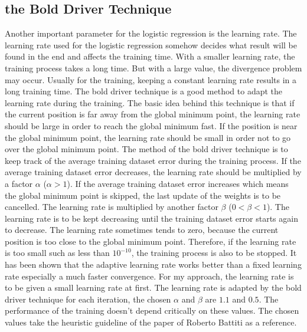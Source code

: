 \subsection{the Bold Driver Technique}
Another important parameter for the logistic regression is the learning rate. The learning rate used  for the logistic regression somehow decides what result will be found in the end and affects the training time. With a smaller learning rate, the training process takes a long time. But with a large value, the divergence problem may occur. Usually for the training, keeping a constant learning rate results in a long training time. The bold driver technique is a good method to adapt the learning rate during the training. The basic idea behind this technique is that if the current position is far away from the global minimum point, the learning rate should be large in order to reach the global minimum fast. If the position is near the global minimum point, the learning rate should be small in order not to go over the global minimum point. The method of the bold driver technique is to keep track of the average training dataset error during the training process. If the average training dataset error decreases, the learning rate should be multiplied by a factor $\alpha$ ($\alpha>1$). If the average training dataset error increases which means the global minimum point is skipped, the last update of the weights is to be cancelled. The learning rate is multiplied by another factor $\beta$ ($0<\beta<1$). The learning rate is to be kept decreasing until the training dataset error starts again to decrease. The learning rate sometimes tends to zero, because the current position is too close to the global minimum point. Therefore, if the learning rate is too small such as less than $10^{-10}$, the training process is also to be stopped. It has been shown that the adaptive learning rate works better than a fixed learning rate especially a much faster convergence. For my approach, the learning rate is to be given a small learning rate at first. The learning rate is adapted by the bold driver technique for each iteration, the chosen $\alpha$ and $\beta$ are $1.1$ and $0.5$. The performance of the training doesn't depend critically on these values. The chosen values take the heuristic guideline of the paper of Roberto Battiti \cite{battiti1989accelerated} as a reference.  

